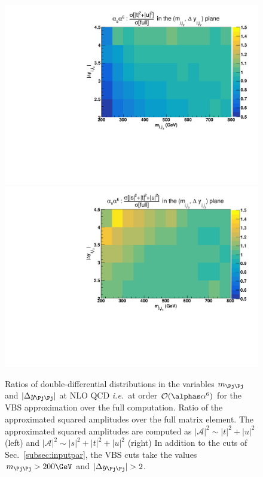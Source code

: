 \begin{figure}[hbt]
\centering
{\includegraphics[scale=0.395]{figures/scanfigures/a6as_vbfnloVSrecola_tu.pdf}}
{\includegraphics[scale=0.395]{figures/scanfigures/a6as_vbfnloVSrecola_stu.pdf}}
\caption{Ratios of double-differential distributions in the variables $m_{\Pj\Pj}$ and $|\Delta y_{\Pj\Pj}|$ at NLO QCD \emph{i.e.}\ at order $\mathcal{O}(\alphas\alpha^6)$ for the VBS approximation over the full computation.
Ratio of the approximated squared amplitudes over the full matrix element.
The approximated squared amplitudes are computed as $|\mathcal{A}|^2 \sim |t|^2+|u|^2$ (left) and $|\mathcal{A}|^2 \sim |s|^2+|t|^2+|u|^2$ (right)
In addition to the cuts of Sec.~\ref{subsec:inputpar}, the VBS cuts take the values $m_{\Pj\Pj}>200 \GeV$ and $|\Delta y_{\Pj\Pj}|>2$.}
\label{fig:ratio2d_NLO}
\end{figure}

